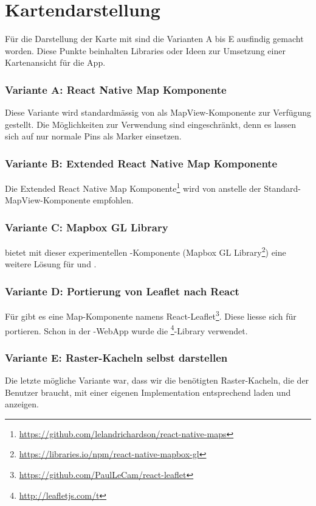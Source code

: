 \section{Kartendarstellung}
\label{tb-evaluation-karte}
Für die Darstellung der Karte mit  sind die Varianten A bis E ausfindig gemacht worden. 
Diese Punkte beinhalten Libraries oder Ideen zur Umsetzung einer Kartenansicht für die App. 


\subsubsection{Variante A: React Native Map Komponente}
Diese Variante wird standardmässig von  als MapView-Komponente zur Verfügung gestellt. 
Die Möglichkeiten zur Verwendung sind eingeschränkt, denn es lassen sich auf  nur normale Pins als Marker einsetzen.\cite{react-native-mapview-pin}


\subsubsection{Variante B: Extended React Native Map Komponente}
Die Extended React Native Map Komponente\footnote{\url{https://github.com/lelandrichardson/react-native-maps}} wird von  anstelle der Standard-MapView-Komponente empfohlen.


\subsubsection{Variante C: Mapbox GL Library}
 bietet mit dieser experimentellen -Komponente (Mapbox GL Library\footnote{\url{https://libraries.io/npm/react-native-mapbox-gl}}) eine weitere Lösung für  und .


\subsubsection{Variante D: Portierung von Leaflet nach React}
Für  gibt es eine Map-Komponente namens React-Leaflet\footnote{\url{https://github.com/PaulLeCam/react-leaflet}}. 
Diese liesse sich für  portieren.
Schon in der \kort{}-\gls{WebApp} wurde die \footnote{\url{http://leafletjs.com/t}}-Library verwendet.


\subsubsection{Variante E: Raster-Kacheln selbst darstellen}
Die letzte mögliche Variante war, dass wir die benötigten Raster-Kacheln, die der Benutzer braucht, mit einer eigenen Implementation entsprechend laden und anzeigen.

